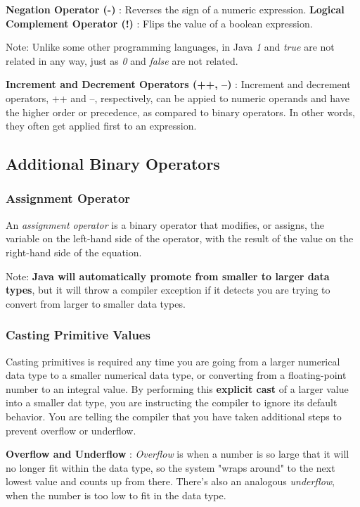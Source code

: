 \documentclass{article}
\begin{document}
\textbf{Negation Operator (-)} : Reverses the sign of a numeric expression.
\textbf{Logical Complement Operator (!)} : Flips the value of a boolean expression.

Note: Unlike some other programming languages, in Java \emph{1} and \emph{true} are not related in any way, just as \emph{0} and \emph{false} are not related.

\textbf{Increment and Decrement Operators (++, --)} : Increment and decrement operators, ++ and --, respectively, can be appied to numeric operands and have the higher order or precedence, as compared to binary operators. In other words, they often get applied first to an expression.

\subsection{Additional Binary Operators}

\subsubsection{Assignment Operator} 
An \emph{assignment operator} is a binary operator that modifies, or assigns, the variable on the left-hand side of the operator, with the result of the value on the right-hand side of the equation.

Note: \textbf{Java will automatically promote from smaller to larger data types}, but it will throw a compiler exception if it detects you are trying to convert from larger to smaller data types.

\subsubsection{Casting Primitive Values}
Casting primitives is required any time you are going from a larger numerical data type to a smaller numerical data type, or converting from a floating-point number to an integral value.
By performing this \textbf{explicit cast} of a larger value into a smaller dat type, you are instructing the compiler to ignore its default behavior. You are telling the compiler that you have taken additional steps to prevent overflow or underflow.

\textbf{Overflow and Underflow} : \emph{Overflow} is when a number is so large that it will no longer fit within the data type, so the system "wraps around" to the next lowest value and counts up from there. There's also an analogous \emph{underflow}, when the number is too low to fit in the data type.
\end{document}
